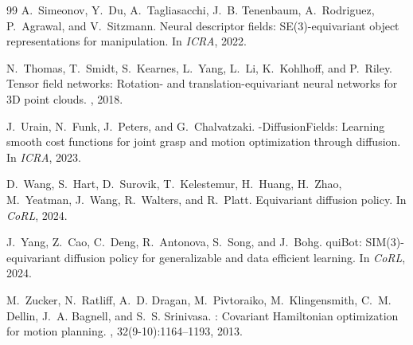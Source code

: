 \documentclass[10pt,twocolumn,letterpaper]{article}
\begin{document}
\begin{thebibliography}{99}
A.~Simeonov, Y.~Du, A.~Tagliasacchi, J.~B. Tenenbaum, A.~Rodriguez, P.~Agrawal,
  and V.~Sitzmann.
\newblock Neural descriptor fields: {SE(3)}-equivariant object representations
  for manipulation.
\newblock In {\em ICRA}, 2022.

N.~Thomas, T.~Smidt, S.~Kearnes, L.~Yang, L.~Li, K.~Kohlhoff, and P.~Riley.
\newblock Tensor field networks: Rotation- and translation-equivariant neural
  networks for 3{D} point clouds.
, 2018.

J.~Urain, N.~Funk, J.~Peters, and G.~Chalvatzaki.
-{D}iffusion{F}ields: Learning smooth cost functions for joint
  grasp and motion optimization through diffusion.
\newblock In {\em ICRA}, 2023.

D.~Wang, S.~Hart, D.~Surovik, T.~Kelestemur, H.~Huang, H.~Zhao, M.~Yeatman,
  J.~Wang, R.~Walters, and R.~Platt.
\newblock Equivariant diffusion policy.
\newblock In {\em CoRL}, 2024.

J.~Yang, Z.~Cao, C.~Deng, R.~Antonova, S.~Song, and J.~Bohg.
qui{B}ot: {SIM(3)}-equivariant diffusion policy for generalizable
  and data efficient learning.
\newblock In {\em CoRL}, 2024.

M.~Zucker, N.~Ratliff, A.~D. Dragan, M.~Pivtoraiko, M.~Klingensmith, C.~M.
  Dellin, J.~A. Bagnell, and S.~S. Srinivasa.
: Covariant Hamiltonian optimization for motion planning.
, 32(9-10):1164--1193, 2013.

\end{thebibliography}
\end{document}
